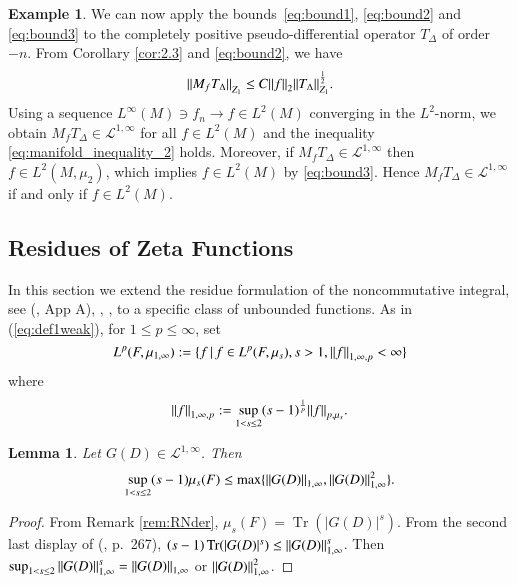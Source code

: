 \documentclass[final,1p]{elsarticle}
\numberwithin{equation}{section}
\theoremstyle{plain}
\newtheorem{lemma}[thm]{Lemma}
\theoremstyle{definition}
\newtheorem{ex}[thm]{Example}
\begin{document}
\begin{ex}
We can now apply the bounds~\eqref{eq:bound1}, \eqref{eq:bound2} and \eqref{eq:bound3}
to the completely positive pseudo-differential operator
$T_\Delta$ of order $-n$.
From Corollary \ref{cor:2.3} and \eqref{eq:bound2}, we have
\begin{equation} \label{eq:manifold_inequality_2}
{\mbox{\ensuremath{\| {M_f T_\Delta } \|}}}_{Z_1} \leq C {\mbox{\ensuremath{\| {f} \|}}}_2 {\mbox{\ensuremath{\| {T_\Delta} \|}}}_{Z_1}^\frac{1}{2}.
\end{equation}
Using a sequence $L^\infty(M) \ni f_n \to f \in L^2(M)$
converging in the $L^2$-norm, we obtain
$M_f T_\Delta \in \mathcal{L}^{1,\infty}$ for all
$f \in L^2(M)$ and the inequality \eqref{eq:manifold_inequality_2} holds.
Moreover, if $M_f T_\Delta \in \mathcal{L}^{1,\infty}$
then $f \in L^2(M,\mu_2)$, which implies $f \in L^2(M)$ by \eqref{eq:bound3}.
Hence $M_f T_\Delta \in \mathcal{L}^{1,\infty}$
if and only if $f \in L^2(M)$.
\end{ex}

\subsection{Residues of Zeta Functions} \label{sec:extres}

\medskip In this section we extend the residue formulation of the noncommutative integral, see (\cite{CM}, App A), \cite{CPS}, \cite{CRSS}, to a specific class of unbounded functions.
As in (\ref{eq:def1weak}), for $1 \leq p \leq \infty$, set
\begin{equation*} 
L^p(F,\mu_{1,\infty}) := {\ensuremath{\{ {f} \, | \, {f \in L^p(F,\mu_s), s > 1, {\mbox{\ensuremath{\| {f} \|}}}_{1,\infty,p} < \infty} \} }}
\end{equation*}
where
$$
{\mbox{\ensuremath{\| {f} \|}}}_{1,\infty,p} := \sup_{1 < s \leq 2} (s-1)^{\frac{1}{p}} {\mbox{\ensuremath{\| {f} \|}}}_{p,\mu_s}.
$$
\begin{lemma} \label{lemma:cont_prelemma}
Let $G(D) \in \mathcal{L}^{1,\infty}$.  Then
$$
\sup_{1 < s \leq 2} (s-1)\mu_s(F) \leq \max \{ {\mbox{\ensuremath{\| {G(D)} \|}}}_{1,\infty} , {\mbox{\ensuremath{\| {G(D)} \|}}}_{1,\infty}^2 \}.
$$
\end{lemma}
\begin{proof}
From Remark \ref{rem:RNder}, $\mu_s(F) = \operatorname{Tr}(|G(D)|^s)$.
From the second last display of (\cite{CRSS}, p.~267),
$(s-1) \operatorname{Tr}(|G(D)|^s) \leq {\mbox{\ensuremath{\| {G(D)} \|}}}_{1,\infty}^s$.
Then $\sup_{ 1< s \leq 2} {\mbox{\ensuremath{\| {G(D)} \|}}}_{1,\infty}^s = {\mbox{\ensuremath{\| {G(D)} \|}}}_{1,\infty}$ or ${\mbox{\ensuremath{\| {G(D)} \|}}}_{1,\infty}^2$.
\end{proof}
\end{document}
